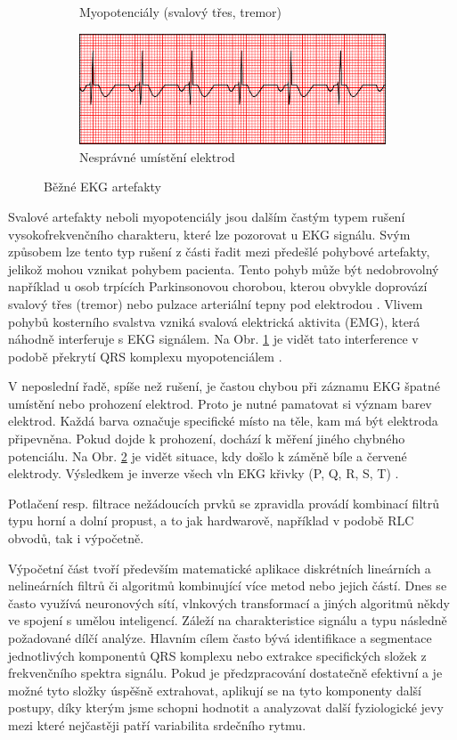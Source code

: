 \begin{figure}[h]
\begin{subfigure}[b]{0.5\linewidth}
		\caption{Myopotenciály (svalový třes, tremor)}
		\label{fig:muscle_tremor}
	\end{subfigure}
	\begin{subfigure}[b]{0.5\linewidth}
		\centering
		\includegraphics[width=0.8\linewidth]{../assets/ecg/rev_electrodes}
		\caption{Nesprávné umístění elektrod}
		\label{fig:rev_electrodes}
	\end{subfigure}
	\caption{Běžné EKG artefakty \cite{Mauvila2004}}
	\label{fig:common_artifacts}
\end{figure}

Svalové artefakty neboli myopotenciály jsou dalším častým typem rušení
vysokofrekvenčního charakteru, které lze pozorovat u EKG signálu. Svým způsobem
lze tento typ rušení z části řadit mezi předešlé pohybové artefakty, jelikož
mohou vznikat pohybem pacienta. Tento pohyb může být nedobrovolný například u
osob trpících Parkinsonovou chorobou, kterou obvykle doprovází svalový třes
(tremor) nebo pulzace arteriální tepny pod elektrodou \cite{Surawicz2008}.
Vlivem pohybů kosterního svalstva vzniká svalová elektrická aktivita (EMG),
která náhodně interferuje s EKG signálem. Na Obr. \ref{fig:muscle_tremor} je
vidět tato interference v podobě překrytí QRS komplexu myopotenciálem
\cite{Goldberger2017}.

V neposlední řadě, spíše než rušení, je častou chybou při záznamu EKG špatné
umístění nebo prohození elektrod. Proto je nutné pamatovat si význam barev
elektrod. Každá barva označuje specifické místo na těle, kam má být elektroda
připevněna. Pokud dojde k prohození, dochází k měření jiného chybného
potenciálu. Na Obr. \ref{fig:rev_electrodes} je vidět situace, kdy došlo k
záměně bíle a červené elektrody. Výsledkem je inverze všech vln EKG křivky (P,
Q, R, S, T) \cite{Goldberger2017,Surawicz2008}.

Potlačení resp. filtrace nežádoucích prvků se zpravidla provádí kombinací filtrů
typu horní a dolní propust, a to jak hardwarově, například v podobě RLC obvodů,
tak i výpočetně. 

Výpočetní část tvoří především matematické aplikace diskrétních
lineárních a nelineárních filtrů či algoritmů kombinující více metod nebo jejich
částí. Dnes se často využívá neuronových sítí, vlnkových transformací a jiných
algoritmů někdy ve spojení s umělou inteligencí. Záleží na charakteristice
signálu a typu následně požadované dílčí analýze. Hlavním cílem často bývá
identifikace a segmentace jednotlivých komponentů QRS komplexu nebo extrakce
specifických složek z frekvenčního spektra signálu. Pokud je předzpracování
dostatečně efektivní a je možné tyto složky úspěšně extrahovat, aplikují se na
tyto komponenty další postupy, díky kterým jsme schopni hodnotit a analyzovat
další fyziologické jevy mezi které nejčastěji patří variabilita srdečního rytmu.

